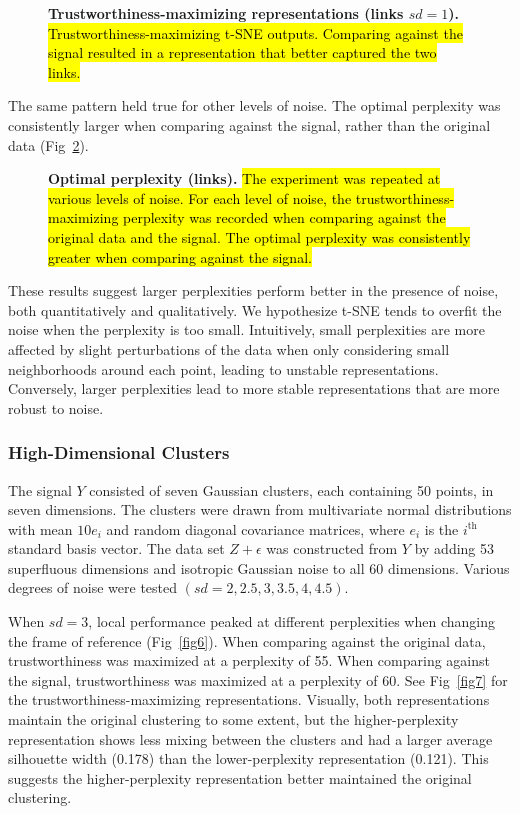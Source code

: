 \documentclass[10pt,letterpaper]{article}
\begin{document}
\begin{figure}[!h]
\caption{{\bf Trustworthiness-maximizing representations (links $sd = 1$).}
\hl{Trustworthiness-maximizing t-SNE outputs. Comparing against the signal resulted in a representation that better captured the two links.}}
\label{fig4}
\end{figure}

The same pattern held true for other levels of noise. The optimal perplexity was consistently larger when comparing against the signal, rather than the original data (Fig~\ref{fig5}).

\begin{figure}[!h]
\caption{{\bf Optimal perplexity (links).}
\hl{The experiment was repeated at various levels of noise. For each level of noise, the trustworthiness-maximizing perplexity was recorded when comparing against the original data and the signal. The optimal perplexity was consistently greater when comparing against the signal.}}
\label{fig5}
\end{figure}

These results suggest larger perplexities perform better in the presence of noise, both quantitatively and qualitatively. We hypothesize t-SNE tends to overfit the noise when the perplexity is too small. Intuitively, small perplexities are more affected by slight perturbations of the data when only considering small neighborhoods around each point, leading to unstable representations. Conversely, larger perplexities lead to more stable representations that are more robust to noise.

\subsubsection*{High-Dimensional Clusters}
The signal $Y$ consisted of seven Gaussian clusters, each containing 50 points, in seven dimensions. The clusters were drawn from multivariate normal distributions with mean $10e_i$ and random diagonal covariance matrices, where $e_i$ is the $i^\textrm{th}$ standard basis vector. The data set $Z + \epsilon$ was constructed from $Y$ by adding 53 superfluous dimensions and isotropic Gaussian noise to all 60 dimensions. Various degrees of noise were tested $(sd = 2, 2.5, 3, 3.5, 4, 4.5)$.

When $sd = 3$, local performance peaked at different perplexities when changing the frame of reference (Fig~\ref{fig6}). When comparing against the original data, trustworthiness was maximized at a perplexity of 55. When comparing against the signal, trustworthiness was maximized at a perplexity of 60. See Fig~\ref{fig7} for the trustworthiness-maximizing representations. Visually, both representations maintain the original clustering to some extent, but the higher-perplexity representation shows less mixing between the clusters and had a larger average silhouette width (0.178) than the lower-perplexity representation (0.121). This suggests the higher-perplexity representation better maintained the original clustering.
\end{document}
